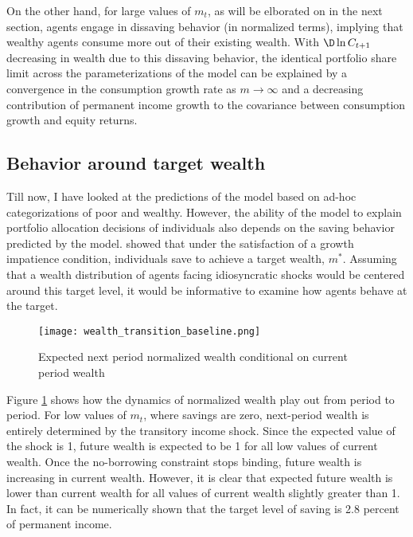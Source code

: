 On the other hand, for large values of $m_{t}$, as will be elborated on in the next section, agents engage in dissaving behavior (in normalized terms), implying that wealthy agents consume more out of their existing wealth. With $\D\ln C_{t+1}$ decreasing in wealth due to this dissaving behavior, the identical portfolio share limit across the parameterizations of the model can be explained by a convergence in the consumption growth rate as $m \to \infty$ and a decreasing contribution of permanent income growth to the covariance between consumption growth and equity returns.

\subsection{Behavior around target wealth}\label{target_wealth}

Till now, I have looked at the predictions of the model based on ad-hoc categorizations of poor and wealthy. However, the ability of the model to explain portfolio allocation decisions of individuals also depends on the saving behavior predicted by the model. \citet{Deaton1991} showed that under the satisfaction of a growth impatience condition, individuals save to achieve a target wealth, $m^*$. Assuming that a wealth distribution of agents facing idiosyncratic shocks would be centered around this target level, it would be informative to examine how agents behave at the target.
\begin{figure}[h]
    \centering
    \texttt{[image: wealth\_transition\_baseline.png]}
    \caption{Expected next period normalized wealth conditional on current period wealth}
    \label{fig:wealth_transition}
\end{figure}
Figure \ref{fig:wealth_transition} shows how the dynamics of normalized wealth play out from period to period. For low values of $m_{t}$, where savings are zero, next-period wealth is entirely determined by the transitory income shock. Since the expected value of the shock is 1, future wealth is expected to be 1 for all low values of current wealth. Once the no-borrowing constraint stops binding, future wealth is increasing in current wealth. However, it is clear that expected future wealth is lower than current wealth for all values of current wealth slightly greater than 1. In fact, it can be numerically shown that the target level of saving is 2.8 percent of permanent income.

